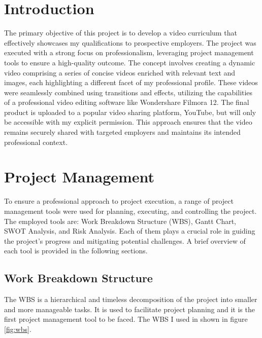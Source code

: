 \documentclass{article}
\begin{document}



\begin{multicols}{2}
    

\section{Introduction}
The primary objective of this project is to develop a video curriculum that effectively showcases my qualifications to prospective employers. The project was 
executed with a strong focus on professionalism, leveraging project management tools to ensure a high-quality outcome.
The concept involves creating a dynamic video comprising a series of concise videos enriched with relevant text and images, each highlighting a different 
facet of my professional profile. These videos were seamlessly combined using transitions and effects, utilizing the capabilities of a professional video 
editing software like Wondershare Filmora 12.
The final product is uploaded to a popular video sharing platform, YouTube, but will only be accessible with my explicit permission. This approach ensures 
that the video remains securely shared with targeted employers and maintains its intended professional context.

\section{Project Management}
To ensure a professional approach to project execution, a range of project management tools were used for planning, executing, and controlling the project.
The employed tools are: Work Breakdown Structure (WBS), Gantt Chart, SWOT Analysis, and Risk Analysis. Each of them plays a crucial role in guiding the project's 
progress and mitigating potential challenges. A brief overview of each tool is provided in the following sections.

    \subsection{Work Breakdown Structure}
    The WBS is a hierarchical and timeless decomposition of the project into smaller and more manageable tasks. It is used to facilitate project planning and it is the first project management
    tool to be faced. The WBS I used in shown in figure \ref{fig:wbs}.


\end{multicols}
\end{document}
